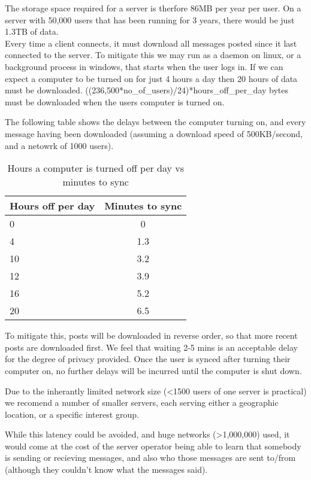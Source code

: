The storage space required for a server is therfore 86MB per year per user. On a
server with 50,000 users that has been running for 3 years, there would be just
1.3TB of data.\\

Every time a client connects, it must download all messages posted since it last
connected to the server. To mitigate this we may run as a daemon on linux, or a
background process in windows, that starts when the user logs in. If we can
expect a computer to be turned on for just 4 hours a day then 20 hours of data
must be downloaded. ((236,500*no\_of\_users)/24)*hours\_off\_per\_day bytes must be
downloaded when the users computer is turned on.

The following table shows the delays between the computer turning on, and every
message having been downloaded (assuming a download speed of 500KB/second, and a
netowrk of 1000 users).

\begin{table}[h]
    \centering
    \begin{tabular}{lc}
    Hours off per day & Minutes to sync       \\ \hline
    0                 &  0 \\
    4                 &  1.3\\
    10                &  3.2\\
    12                &  3.9\\
    16                &  5.2\\
    20                &  6.5\\
    \end{tabular}
    \caption{Hours a computer is turned off per day vs minutes to sync}
\end{table}

To mitigate this, posts will be downloaded in reverse order, so that more recent
posts are downloaded first. We feel that waiting 2-5 mins is an acceptable delay
for the degree of privacy provided. Once the user is synced after turning their
computer on, no further delays will be incurred until the computer is shut down.

Due to the inherantly limited network size (\textless1500 users of one server is
practical) we recomend a number of smaller servers, each serving either a
geographic location, or a specific interest group.

While this latency could be avoided, and huge networks (\textgreater1,000,000)
used, it would come at the cost of the server operator being able to learn that
somebody is sending or recieving messages, and also who those messages are sent
to/from (although they couldn't know what the messages said).

